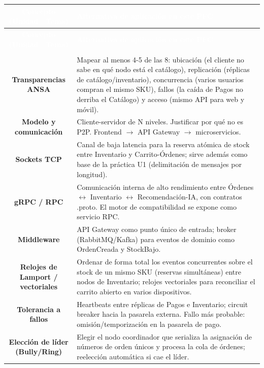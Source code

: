 \documentclass[11pt]{article}
\begin{document}
\begin{longtable}{C A}
\textcolor{white}{\textbf{Concepto (Unidad $\cdot$ Tema)}} & \textcolor{white}{\textbf{Alternativa de aplicación en este PFC}}\\
\endfirsthead
{}\textcolor{white}{\textbf{Concepto (Unidad $\cdot$ Tema)}} & \textcolor{white}{\textbf{Alternativa de aplicación en este PFC}}\\
\endhead
{}\\
\textbf{Transparencias ANSA} & Mapear al menos 4-5 de las 8: ubicación (el cliente no sabe en qué nodo está el catálogo), replicación (réplicas de catálogo/inventario), concurrencia (varios usuarios compran el mismo SKU), fallos (la caída de Pagos no derriba el Catálogo) y acceso (mismo API para web y móvil).\\
\textbf{Modelo y comunicación} & Cliente-servidor de N niveles. Justificar por qué no es P2P. Frontend $\rightarrow$ API Gateway $\rightarrow$ microservicios.\\
\textbf{Sockets TCP} & Canal de baja latencia para la reserva atómica de stock entre Inventario y Carrito-Órdenes; sirve además como base de la práctica U1 (delimitación de mensajes por longitud).\\
\textbf{gRPC / RPC} & Comunicación interna de alto rendimiento entre Órdenes $\leftrightarrow$ Inventario $\leftrightarrow$ Recomendación-IA, con contratos .proto. El motor de compatibilidad se expone como servicio RPC.\\
\textbf{Middleware} & API Gateway como punto único de entrada; broker (RabbitMQ/Kafka) para eventos de dominio como OrdenCreada y StockBajo.\\
\textbf{Relojes de Lamport / vectoriales} & Ordenar de forma total los eventos concurrentes sobre el stock de un mismo SKU (reservas simultáneas) entre nodos de Inventario; relojes vectoriales para reconciliar el carrito abierto en varios dispositivos.\\
\textbf{Tolerancia a fallos} & Heartbeats entre réplicas de Pagos e Inventario; circuit breaker hacia la pasarela externa. Fallo más probable: omisión/temporización en la pasarela de pago.\\
\textbf{Elección de líder (Bully/Ring)} & Elegir el nodo coordinador que serializa la asignación de números de orden únicos y procesa la cola de órdenes; reelección automática si cae el líder.\\

\end{longtable}
\end{document}
